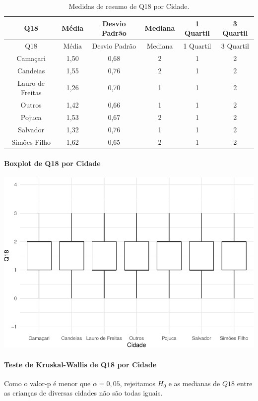 \documentclass[]{article}
\let\oldparagraph\paragraph
\renewcommand{\paragraph}[1]{\oldparagraph{#1}\mbox{}}
\begin{document}
\begin{longtable}[]{@{}cccccc@{}}
\caption{\label{tab:unnamed-chunk-222}Medidas de resumo de Q18 por Cidade.}\tabularnewline
\toprule
Q18 & Média & Desvio Padrão & Mediana & 1 Quartil & 3 Quartil\tabularnewline
\midrule
\endfirsthead
\toprule
Q18 & Média & Desvio Padrão & Mediana & 1 Quartil & 3 Quartil\tabularnewline
\midrule
\endhead
Camaçari & 1,50 & 0,68 & 2 & 1 & 2\tabularnewline
Candeias & 1,55 & 0,76 & 2 & 1 & 2\tabularnewline
Lauro de Freitas & 1,26 & 0,70 & 1 & 1 & 2\tabularnewline
Outros & 1,42 & 0,66 & 1 & 1 & 2\tabularnewline
Pojuca & 1,53 & 0,67 & 2 & 1 & 2\tabularnewline
Salvador & 1,32 & 0,76 & 1 & 1 & 2\tabularnewline
Simões Filho & 1,62 & 0,65 & 2 & 1 & 2\tabularnewline
\bottomrule
\end{longtable}

\hypertarget{boxplot-de-q18-por-cidade}{%
\paragraph{Boxplot de Q18 por Cidade}\label{boxplot-de-q18-por-cidade}}

\begin{center}\includegraphics[width=0.75\linewidth]{relatorio_files/figure-latex/unnamed-chunk-223-1} \end{center}

\hypertarget{teste-de-kruskal-wallis-de-q18-por-cidade}{%
\paragraph{Teste de Kruskal-Wallis de Q18 por Cidade}\label{teste-de-kruskal-wallis-de-q18-por-cidade}}

Como o valor-p é menor que \(\alpha=0,05\), rejeitamos \(H_0\) e as medianas de \(Q18\) entre as crianças de diversas cidades não são todas iguais.
\end{document}
